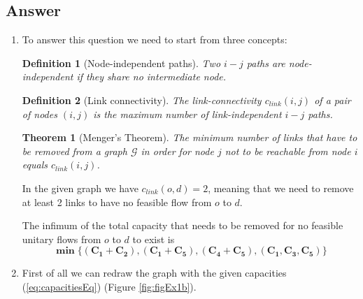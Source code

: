 \documentclass[
	12pt, %
]{fphw}
\newtheorem{theorem}{Theorem}
\newtheorem{definition}{Definition}
\begin{document}
\subsection*{Answer}%
\begin{enumerate}[{\bfseries (a)}]
    \item To answer this question we need to start from three concepts:
    \begin{definition}[Node-independent paths]
        Two $i-j$ paths are    \emph{node-independent} if they share no intermediate node.
    \end{definition}
    \begin{definition}[Link connectivity]
        The \emph{link-connectivity} $c_{link}(i,j)$ of a pair of nodes $(i, j)$ is the maximum number of \emph{link-independent} $i-j$ paths.
    \end{definition}
    \begin{theorem}[Menger's Theorem]
        The minimum number of links that have to be removed from a graph $\mathcal{G}$ in order for node $j$ not to be reachable from node $i$ equals $c_{link}(i, j)$.
    \end{theorem}
    
    In the given graph we have  $c_{link}(o,d) = 2$, meaning that we need to remove at least 2 links to have no feasible flow from $o$ to $d$. 
    
    The infimum of  the  total  capacity  that  needs  to  be  removed  for  no  feasible unitary flows from $o$ to $d$ to exist is 
    $$
        \mathbf{\min{\{(C_1+C_2), (C_1+C_5), (C_4+C_5), (C_1,C_3,C_5)\}}}
    $$
    
    
    \item First of all we can redraw the graph with the given capacities (\ref{eq:capacitiesEq}) (Figure \ref{fig:figEx1b}).
        

\end{enumerate}
\end{document}
